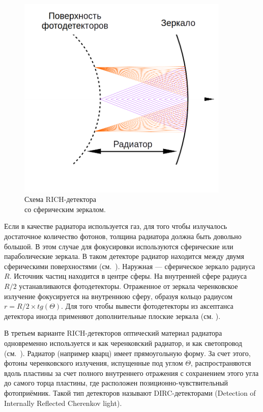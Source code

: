 \begin{minipage}[t]{0.495\textwidth}
\begin{figure}[H]
\includegraphics[width=0.9\textwidth]{pictures/RICH_spherical.png}
\caption{Схема RICH-детектора \\со сферическим зеркалом.}
\label{fig:RICHspherical}
\end{figure}
\end{minipage}
\begin{minipage}[t]{0.495\textwidth}
Если в качестве радиатора используется газ, для того чтобы излучалось достаточное количество фотонов, толщина радиатора должна быть довольно большой. В этом случае для фокусировки используются сферические или параболические зеркала. В таком детекторе радиатор находится между двумя сферическими поверхностями (см.~). Наружная --- сферическое зеркало радиуса $R$. Источник частиц находится в центре сферы. На внутренней сфере радиуса $R/2$ устанавливаются фотодетекторы. Отраженное от зеркала черенковское излучение фокусируется на внутреннюю сферу, образуя кольцо радиусом $r = R/2 \times tg(\Theta)$. Для того чтобы вывести фотодетекторы из аксептанса детектора иногда применяют дополнительные плоские зеркала (см. \todo).
\end{minipage}

В третьем варианте RICH-детекторов оптический материал радиатора одновременно используется и как черенковский радиатор, и как светопровод (см.~). Радиатор (например кварц) имеет прямоугольную форму. За счет этого, фотоны черенковского излучения, испущенные под углом $\Theta$, распространяются вдоль пластины за счет полного внутреннего отражения с сохранением этого угла до самого торца пластины, где расположен позиционно-чувствительный фотоприёмник. Такой тип детекторов называют DIRC-детекторами (Detection of Internally Reflected Cherenkov light).

